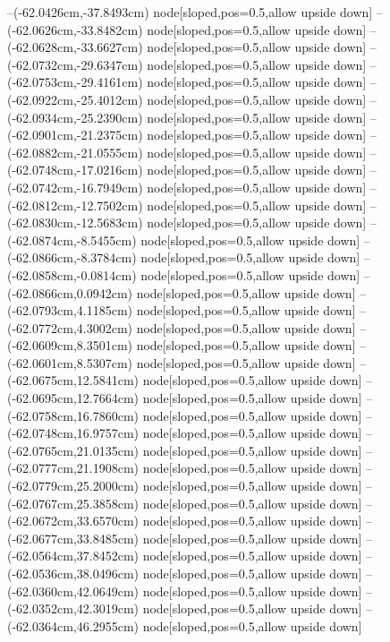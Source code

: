 --(-62.0426cm,-37.8493cm) node[sloped,pos=0.5,allow upside down]{\arrowIn}
--(-62.0626cm,-33.8482cm) node[sloped,pos=0.5,allow upside down]{\ArrowIn}
--(-62.0628cm,-33.6627cm) node[sloped,pos=0.5,allow upside down]{\arrowIn}
--(-62.0732cm,-29.6347cm) node[sloped,pos=0.5,allow upside down]{\ArrowIn}
--(-62.0753cm,-29.4161cm) node[sloped,pos=0.5,allow upside down]{\arrowIn}
--(-62.0922cm,-25.4012cm) node[sloped,pos=0.5,allow upside down]{\ArrowIn}
--(-62.0934cm,-25.2390cm) node[sloped,pos=0.5,allow upside down]{\arrowIn}
--(-62.0901cm,-21.2375cm) node[sloped,pos=0.5,allow upside down]{\ArrowIn}
--(-62.0882cm,-21.0555cm) node[sloped,pos=0.5,allow upside down]{\arrowIn}
--(-62.0748cm,-17.0216cm) node[sloped,pos=0.5,allow upside down]{\ArrowIn}
--(-62.0742cm,-16.7949cm) node[sloped,pos=0.5,allow upside down]{\arrowIn}
--(-62.0812cm,-12.7502cm) node[sloped,pos=0.5,allow upside down]{\ArrowIn}
--(-62.0830cm,-12.5683cm) node[sloped,pos=0.5,allow upside down]{\arrowIn}
--(-62.0874cm,-8.5455cm) node[sloped,pos=0.5,allow upside down]{\ArrowIn}
--(-62.0866cm,-8.3784cm) node[sloped,pos=0.5,allow upside down]{\arrowIn}
--(-62.0858cm,-0.0814cm) node[sloped,pos=0.5,allow upside down]{\ArrowIn}
--(-62.0866cm,0.0942cm) node[sloped,pos=0.5,allow upside down]{\arrowIn}
--(-62.0793cm,4.1185cm) node[sloped,pos=0.5,allow upside down]{\ArrowIn}
--(-62.0772cm,4.3002cm) node[sloped,pos=0.5,allow upside down]{\arrowIn}
--(-62.0609cm,8.3501cm) node[sloped,pos=0.5,allow upside down]{\ArrowIn}
--(-62.0601cm,8.5307cm) node[sloped,pos=0.5,allow upside down]{\arrowIn}
--(-62.0675cm,12.5841cm) node[sloped,pos=0.5,allow upside down]{\ArrowIn}
--(-62.0695cm,12.7664cm) node[sloped,pos=0.5,allow upside down]{\arrowIn}
--(-62.0758cm,16.7860cm) node[sloped,pos=0.5,allow upside down]{\ArrowIn}
--(-62.0748cm,16.9757cm) node[sloped,pos=0.5,allow upside down]{\arrowIn}
--(-62.0765cm,21.0135cm) node[sloped,pos=0.5,allow upside down]{\ArrowIn}
--(-62.0777cm,21.1908cm) node[sloped,pos=0.5,allow upside down]{\arrowIn}
--(-62.0779cm,25.2000cm) node[sloped,pos=0.5,allow upside down]{\ArrowIn}
--(-62.0767cm,25.3858cm) node[sloped,pos=0.5,allow upside down]{\arrowIn}
--(-62.0672cm,33.6570cm) node[sloped,pos=0.5,allow upside down]{\ArrowIn}
--(-62.0677cm,33.8485cm) node[sloped,pos=0.5,allow upside down]{\arrowIn}
--(-62.0564cm,37.8452cm) node[sloped,pos=0.5,allow upside down]{\ArrowIn}
--(-62.0536cm,38.0496cm) node[sloped,pos=0.5,allow upside down]{\arrowIn}
--(-62.0360cm,42.0649cm) node[sloped,pos=0.5,allow upside down]{\ArrowIn}
--(-62.0352cm,42.3019cm) node[sloped,pos=0.5,allow upside down]{\arrowIn}
--(-62.0364cm,46.2955cm) node[sloped,pos=0.5,allow upside down]{\ArrowIn}
